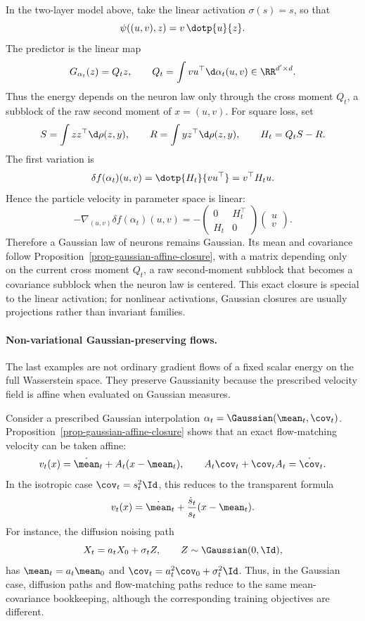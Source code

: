 \begin{example}
	In the two-layer model above, take the linear activation $\sigma(s)=s$, so that
	\[
		\psi((u,v),z)=v\,\dotp{u}{z}.
	\]
	The predictor is the linear map
	\[
		G_{\alpha_t}(z)=Q_t z,
		\qquad
		Q_t=\int v u^\top\d\alpha_t(u,v)\in\RR^{d'\times d}.
	\]
	Thus the energy depends on the neuron law only through the cross moment $Q_t$, a subblock of the raw second moment of $x=(u,v)$. For square loss, set
	\[
		S=\int zz^\top\d\rho(z,y),
		\qquad
		R=\int y z^\top\d\rho(z,y),
		\qquad
		H_t=Q_tS-R.
	\]
	The first variation is
	\[
		\delta f(\alpha_t)(u,v)=\dotp{H_t}{v u^\top}=v^\top H_t u.
	\]
	Hence the particle velocity in parameter space is linear:
	\[
		-\nabla_{(u,v)}\delta f(\alpha_t)(u,v)
		=
		-\begin{pmatrix}
			0 & H_t^\top \\
			H_t & 0
		\end{pmatrix}
		\begin{pmatrix} u \\ v \end{pmatrix}.
	\]
	Therefore a Gaussian law of neurons remains Gaussian. Its mean and covariance follow Proposition~\ref{prop-gaussian-affine-closure}, with a matrix depending only on the current cross moment $Q_t$, a raw second-moment subblock that becomes a covariance subblock when the neuron law is centered. This exact closure is special to the linear activation; for nonlinear activations, Gaussian closures are usually projections rather than invariant families.
\end{example}

\paragraph{Non-variational Gaussian-preserving flows.}

The last examples are not ordinary gradient flows of a fixed scalar energy on the full Wasserstein space. They preserve Gaussianity because the prescribed velocity field is affine when evaluated on Gaussian measures.

\begin{example}
	Consider a prescribed Gaussian interpolation $\alpha_t=\Gaussian(\mean_t,\cov_t)$. Proposition~\ref{prop-gaussian-affine-closure} shows that an exact flow-matching velocity can be taken affine:
	\[
		v_t(x)=\dot\mean_t+A_t(x-\mean_t),
		\qquad
		A_t\cov_t+\cov_t A_t=\dot\cov_t.
	\]
	In the isotropic case $\cov_t=s_t^2\Id$, this reduces to the transparent formula
	\[
		v_t(x)=\dot\mean_t+\frac{\dot s_t}{s_t}(x-\mean_t).
	\]
	For instance, the diffusion noising path
	\[
		X_t=a_tX_0+\sigma_t Z,\qquad Z\sim\Gaussian(0,\Id),
	\]
	has $\mean_t=a_t\mean_0$ and $\cov_t=a_t^2\cov_0+\sigma_t^2\Id$. Thus, in the Gaussian case, diffusion paths and flow-matching paths reduce to the same mean-covariance bookkeeping, although the corresponding training objectives are different.
\end{example}

